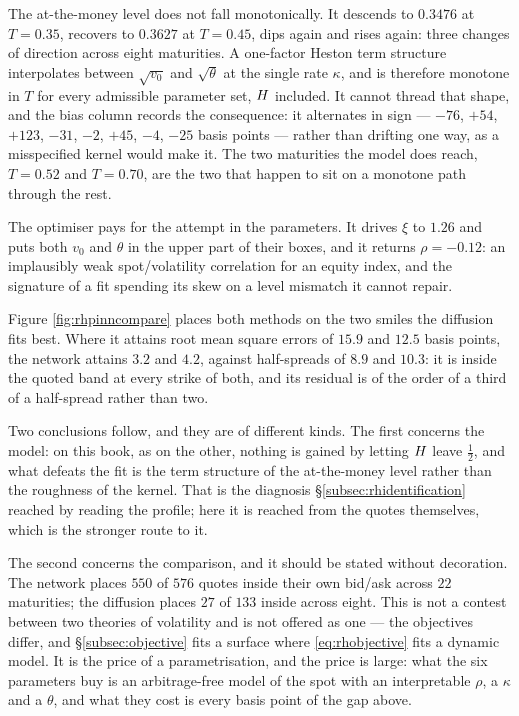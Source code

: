 The at-the-money level does not fall monotonically. It descends to $0.3476$ at $T=0.35$, recovers to
$0.3627$ at $T=0.45$, dips again and rises again: three changes of direction across eight maturities.
A one-factor Heston term structure interpolates between $\sqrt{v_{0}}$ and $\sqrt{\theta}$ at the
single rate $\kappa$, and is therefore monotone in $T$ for every admissible parameter set, $H$
included. It cannot thread that shape, and the bias column records the consequence: it alternates in
sign --- $-76$, $+54$, $+123$, $-31$, $-2$, $+45$, $-4$, $-25$ basis points --- rather than drifting
one way, as a misspecified kernel would make it. The two maturities the model does reach, $T=0.52$
and $T=0.70$, are the two that happen to sit on a monotone path through the rest.

The optimiser pays for the attempt in the parameters. It drives $\xi$ to $1.26$ and puts both
$v_{0}$ and $\theta$ in the upper part of their boxes, and it returns $\rho=-0.12$: an implausibly
weak spot/volatility correlation for an equity index, and the signature of a fit spending its skew on
a level mismatch it cannot repair.

Figure \ref{fig:rhpinncompare} places both methods on the two smiles the diffusion fits best. Where
it attains root mean square errors of $15.9$ and $12.5$ basis points, the network attains $3.2$ and
$4.2$, against half-spreads of $8.9$ and $10.3$: it is inside the quoted band at every strike of
both, and its residual is of the order of a third of a half-spread rather than two.



Two conclusions follow, and they are of different kinds. The first concerns the model: on this book,
as on the other, nothing is gained by letting $H$ leave $\tfrac12$, and what defeats the fit is
the term structure of the at-the-money level rather than the roughness of the kernel. That is the
diagnosis \S\ref{subsec:rhidentification} reached by reading the profile; here it is reached from the
quotes themselves, which is the stronger route to it.

The second concerns the comparison, and it should be stated without decoration. The network places
$550$ of $576$ quotes inside their own bid/ask across $22$ maturities; the diffusion places $27$ of
$133$ inside across eight. This is not a contest between two theories of volatility and is not
offered as one --- the objectives differ, and \S\ref{subsec:objective} fits a surface where
\eqref{eq:rhobjective} fits a dynamic model. It is the price of a parametrisation, and the price is
large: what the six parameters buy is an arbitrage-free model of the spot with an interpretable
$\rho$, a $\kappa$ and a $\theta$, and what they cost is every basis point of the gap above.

